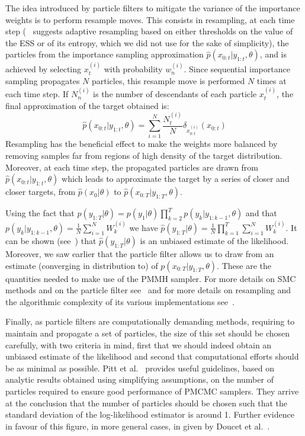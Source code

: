 \documentclass[12pt]{article}
\begin{document}
	The idea introduced by particle filters to mitigate the variance of the importance weights is to perform resample moves. This consists in resampling, at each time step (~\cite{doucet2009tutorial} suggests adaptive resampling based on either thresholds on the value of the ESS or of its entropy, which we did not use for the sake of simplicity), the particles from the importance sampling approximation $\hat{p}(x_{0:t}|y_{1:t}, \theta)$, and is achieved by selecting $x_t^{(i)}$ with probability $w_n^{(i)}$. Since sequential importance sampling propagates $N$ particles, this resample move is performed $N$ times at each time step. If $N_n^{(i)}$ is the number of descendants of each particle $x_t^{(i)}$, the final approximation of the target obtained is:
	\begin{equation*}
 	\hat{p}(x_{0:t}|y_{1:t}, \theta) = \sum_{i=1}^{N}\frac{N_t^{(i)}}{N} \delta_{x_{0:t}^{(i)}}(x_{0:t})
	\end{equation*}
	Resampling has the beneficial effect to make the weights more balanced by removing samples far from regions of high density of the target distribution. Moreover, at each time step, the propagated particles are drawn from $\hat{p}(x_{0:t}|y_{1:t}, \theta)$ which leads to approximate the target by a series of closer and closer targets, from $\hat{p}(x_0|\theta)$ to $\hat{p}(x_{0:T}|y_{1:T}, \theta)$. 
	 
	Using the fact that $p(y_{1:T}| \theta) = p(y_1|\theta)\prod_{k=2}^{T}p(y_k|y_{1:k-1}, \theta)$ and that \\
	$p(y_k|y_{1:k-1}, \theta) = \frac{1}{N}\sum_{i=1}^{N}W_k^{(i)}$ we have $\hat{p}(y_{1:T}| \theta)=\frac{1}{N}\prod_{k=1}^{T}\sum_{i=1}^{N}W_k^{(i)}$. It can be shown (see~\cite{del2004feynman}) that $\hat{p}(y_{1:T}| \theta)$ is an unbiased estimate of the likelihood. Moreover, we saw earlier that the particle filter allows us to draw from an estimate (converging in distribution to) of $p(x_{0:T}|y_{1:T}, \theta)$. These are the quantities needed to make use of the PMMH sampler. For more details on SMC methods and on the particle filter see~\cite{doucet2009tutorial} and for more details on resampling and the algorithmic complexity of its various implementations see~\cite{murray2013parallel}.
	
	Finally, as particle filters are computationally demanding methods, requiring to maintain and propagate a set of particles, the size of this set should be chosen carefully, with two criteria in mind, first that we should indeed obtain an unbiased estimate of the likelihood and second that computational efforts should be as minimal as possible. Pitt et al.~\cite{pitt2012some} provides useful guidelines, based on analytic results obtained using simplifying assumptions, on the number of particles required to ensure good performance of PMCMC samplers. They arrive at the conclusion that the number of particles should be chosen such that the standard deviation of the log-likelihood estimator is around 1. Further evidence in favour of this figure, in more general cases, in given by Doucet et al.~\cite{doucet2015efficient}.
	
\end{document}
